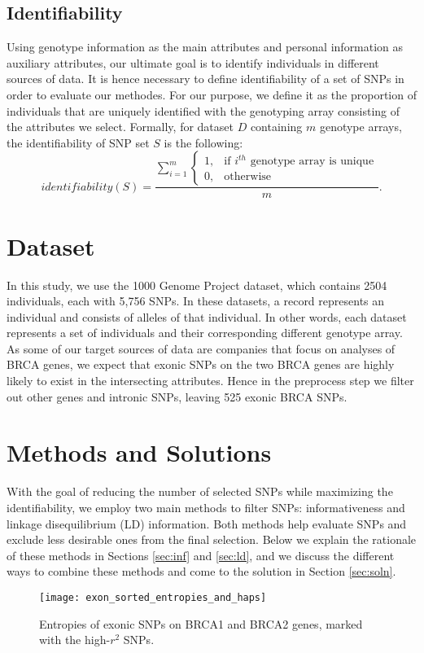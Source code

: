 \documentclass[14pt, oneside]{article}   	%
\begin{document}
\subsection{Identifiability}
Using genotype information as the main attributes and personal information as auxiliary attributes,
our ultimate goal is to identify individuals in different sources of data.
It is hence necessary to define identifiability of a set of SNPs in order to evaluate our methodes.
For our purpose, we define it as the proportion of individuals
that are uniquely identified with the genotyping array consisting of the attributes we select.
Formally, for dataset $D$ containing $m$ genotype arrays, the identifiability of SNP set $S$ is the following:
\[
identifiability(S) = \frac{\sum\limits_{i = 1}^{m}
\begin{cases}
1, & \text{if } i^{th} \text{ genotype array is unique}\\
0, & \text{otherwise}
\end{cases}
}
{m} .
\]
%
\section{Dataset}
In this study, we use the 1000 Genome Project dataset, which contains 2504 individuals, each with 5,756 SNPs.
In these datasets, a record represents an individual and consists of alleles of that individual.
In other words, each dataset represents a set of individuals and their corresponding different genotype array.
As some of our target sources of data are companies that focus on analyses of BRCA genes,
we expect that exonic SNPs on the two BRCA genes are highly likely to exist in the intersecting attributes.
Hence in the preprocess step we filter out other genes and intronic SNPs, leaving 525 exonic BRCA SNPs.

\section{Methods and Solutions}\label{sec:app_and_soln}
With the goal of reducing the number of selected SNPs while maximizing the identifiability,
we employ two main methods to filter SNPs: informativeness and linkage disequilibrium (LD) information.
Both methods help evaluate SNPs and exclude less desirable ones from the final selection.
Below we explain the rationale of these methods in Sections \ref{sec:inf} and \ref{sec:ld},
and we discuss the different ways to combine these methods and come to the solution in Section \ref{sec:soln}.
\begin{figure}[t]
\centering
\texttt{[image: exon\_sorted\_entropies\_and\_haps]}
\caption{Entropies of exonic SNPs on BRCA1 and BRCA2 genes, marked with the high-$r^2$ SNPs.}
\label{fig:ents_haps}
\end{figure}
\end{document}
